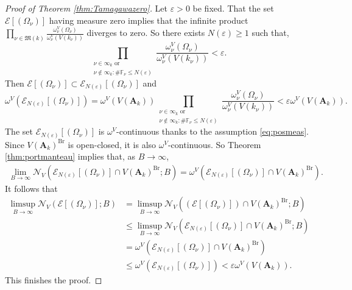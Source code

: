 \documentclass[11pt,letterpaper]{amsart}
\newcommand{\BF}{{\mathbb {F}}}
\newcommand{\CE}{{\mathcal {E}}}
\newcommand{\CN}{{\mathcal {N}}}
\newcommand{\RA}{{\mathbf {A}}}
\theoremstyle{plain}
\numberwithin{equation}{section}
\theoremstyle{definition}
\theoremstyle{remark}
\begin{document}
\begin{proof}[Proof of Theorem \ref{thm:Tamagawazero}]
Let $\varepsilon>0$ be fixed. That the set $\CE[(\Omega_{\nu})]$ having measure zero implies that the infinite product
$\prod_{\nu\in\mathfrak{M}(k)}\frac{\omega_\nu^V(\Omega_\nu)}{\omega_\nu^V(V(k_\nu))}$ diverges to zero. So there exists $N(\varepsilon)\geqslant 1$ such that,  $$\prod_{\substack{\nu\in\infty_k\text{ or}\\\nu\not\in\infty_k:  \#\BF_\nu\leqslant N(\varepsilon)}}\frac{\omega_\nu^V(\Omega_\nu)}{\omega_\nu^V(V(k_\nu))}<\varepsilon.$$
Then $\CE[(\Omega_{\nu})]\subset \CE_{N(\varepsilon)}[(\Omega_{\nu})]$ and 
$$\omega^V\left(\CE_{N(\varepsilon)}[(\Omega_{\nu})]\right)=\omega^V(V(\RA_k))\prod_{\substack{\nu\in\infty_k\text{ or}\\\nu\not\in\infty_k:  \#\BF_\nu\leqslant N(\varepsilon)}}\frac{\omega_\nu^V(\Omega_\nu)}{\omega_\nu^V(V(k_\nu))}<\varepsilon \omega^V(V(\RA_k)).$$
The set $\CE_{N(\varepsilon)}[(\Omega_{\nu})]$ is $\omega^V$-continuous thanks to the assumption \eqref{eq:posmeas}. Since $V(\RA_k)^{\operatorname{Br}}$ is open-closed, it is also $\omega^V$-continuous. So Theorem \ref{thm:portmanteau}  implies that, as $B\to \infty$,
\begin{align*}
	\lim_{B\to\infty}\CN_V\left(\CE_{N(\varepsilon)}[(\Omega_{\nu})]\cap V(\RA_k)^{\operatorname{Br}};B\right)= \omega^V\left(\CE_{N(\varepsilon)}[(\Omega_{\nu})]\cap V(\RA_k)^{\operatorname{Br}}\right).
\end{align*}
It follows that 
\begin{align*}
	\limsup_{B\to\infty}\CN_V\left(\CE[(\Omega_{\nu})];B\right)&=\limsup_{B\to\infty}\CN_V\left(\left(\CE[(\Omega_{\nu})]\right)\cap V(\RA_k)^{\operatorname{Br}};B\right)\\ &\leqslant \limsup_{B\to\infty}\CN_V\left(\CE_{N(\varepsilon)}[(\Omega_{\nu})]\cap V(\RA_k)^{\operatorname{Br}};B\right)\\ &= \omega^V\left(\CE_{N(\varepsilon)}[(\Omega_{\nu})]\cap V(\RA_k)^{\operatorname{Br}}\right)\\ &\leqslant \omega^V\left(\CE_{N(\varepsilon)}[(\Omega_{\nu})]\right)<\varepsilon \omega^V(V(\RA_k)).
\end{align*}
This finishes the proof.
\end{proof}
\end{document}
